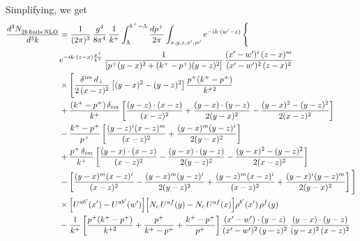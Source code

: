 \documentclass[9pt]{article}
\numberwithin{equation}{section}
\begin{document}
Simplifying, we get
\begin{align}
    \frac{d^{3}N_{2b\,\rm finite\, NLO}^{\rm}}{d^{3}k} & = \frac{1}{(2\pi)^{3}}\,\frac{g^{4}}{8\pi^{4}}\,\frac{1}{k^{+}}\int_{\Lambda}^{k^{+}-\Lambda}\frac{dp^{+}}{2\pi}\int_{x,y,z,x',w'}e^{-ik\cdot(w'-z)}\,\Bigg\{\notag\\
&e^{-ik\cdot(z-x)\frac{p^{+}}{k^{+}}}\,\frac{1}{\left[p^{+}(y-x)^{2}+(k^{+}-p^{+})(y-z)^{2}\right]}\,\frac{(x'-w')^{i}\,(z-x)^{m}}{(x'-w')^{2}\,(z-x)^{2}}\notag\\
&\times\Bigg[\frac{\delta^{im}\,d_{\perp}}{2\,(x-z)^{2}}\left[(y-x)^{2}-(y-z)^{2}\right]\frac{p^{+}(k^{+}-p^{+})}{k^{+2}}
\notag \\ & +\frac{(k^{+}-p^{+})\,\delta_{im}}{k^{+}}\left[\frac{(y-z)\cdot(x-z)}{(x-z)^{2}}+\frac{(y-x)\cdot(y-z)}{2(y-x)^{2}}-\frac{(y-x)^{2}-(y-z)^{2}}{2(x-z)^{2}}\right]\notag\\
&-\frac{k^{+}-p^{+}}{p^{+}}\left[\frac{(y-z)^{i}(x-z)^{m}}{(x-z)^{2}}+\frac{(y-x)^{m}(y-z)^{i}}{2(y-x)^{2}}\right]\notag\\
&+\frac{p^{+}\,\delta_{im}}{k^{+}}\left[\frac{(y-x)\cdot(x-z)}{(x-z)^{2}}-\frac{(y-x)\cdot(y-z)}{2(y-z)^{2}}-\frac{(y-x)^{2}-(y-z)^{2}}{2(x-z)^{2}}\right]\notag\\
&-\left[\frac{(y-x)^{m}(x-z)^{i}}{(x-z)^{2}}-\frac{(y-x)^{m}(y-z)^{i}}{2(y-z)^{2}}+\frac{(y-z)^{m}(x-z)^{i}}{(x-z)^{2}}+\frac{(y-x)^{i}(y-z)^{m}}{2(y-x)^{2}}\right]\Bigg]\notag\\
&\times\Big[U^{ab'}(x')-U^{ab'}(w')\Big]\Big[N_{c}\,U^{af}(y)-N_{c}\,U^{af}(x)\Big]\rho^{b'}(x')\,\rho^{f}(y)\notag\\
&-\frac{1}{k^{+}}\left[\frac{p^{+}(k^{+}-p^{+})}{k^{+2}}+\frac{p^{+}}{k^{+}-p^{+}}+\frac{k^{+}-p^{+}}{p^{+}}\right]
\frac{(x'-w')\cdot(y-z)}{(x'-w')^{2}\,(y-z)^{2}}\,\frac{(y-x)\cdot(y-z)}{(y-x)^{2}\,(x-z)^{2}}\notag\\

\end{align}
\end{document}

